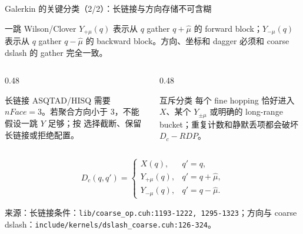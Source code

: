 \documentclass[UTF8,aspectratio=169,11pt]{ctexbeamer}
\newcommand{\source}[1]{\vspace{0.05em}\par{\raggedright\scriptsize\color{muted}来源：#1\par}}
\newcommand{\codepath}[1]{\nolinkurl{#1}}
\begin{document}
\begin{frame}[t]{Galerkin 的关键分类（2/2）：长链接与方向存储不可含糊}
  \begin{block}{一跳 Wilson/Clover}
    \(Y_{+\mu}(q)\) 表示从 \(q\) gather \(q+\hat\mu\) 的 forward block；\(Y_{-\mu}(q)\) 表示从 \(q\) gather \(q-\hat\mu\) 的 backward block。方向、坐标和 dagger 必须和 coarse dslash 的 gather 完全一致。
  \end{block}
  \vspace{0.08cm}
  \begin{columns}[T,totalwidth=\textwidth]
    \begin{column}{0.48\textwidth}
      \begin{block}{长链接}
        ASQTAD/HISQ 需要 \(nFace=3\)。若聚合方向小于 3，不能假设一跳 \(Y\) 足够；按 \texttt{} 选择截断、保留长链接或拒绝配置。
      \end{block}
    \end{column}
    \begin{column}{0.48\textwidth}
      \begin{alertblock}{互斥分类}
        每个 fine hopping 恰好进入 \(X\)、某个 \(Y_{\pm\mu}\) 或明确的 long-range bucket；重复计数和静默丢项都会破坏 \(D_c-RDP\)。
      \end{alertblock}
    \end{column}
  \end{columns}
  \vspace{0.15cm}
  \begin{equation*}
    D_c(q,q')=
    \begin{cases}
      X(q),&q'=q,\\
      Y_{+\mu}(q),&q'=q+\hat\mu,\\
      Y_{-\mu}(q),&q'=q-\hat\mu.
    \end{cases}
  \end{equation*}
  \source{长链接条件：\codepath{lib/coarse_op.cuh:1193-1222, 1295-1323}；方向与 coarse dslash：\codepath{include/kernels/dslash_coarse.cuh:126-324}。}
\end{frame}
\end{document}
